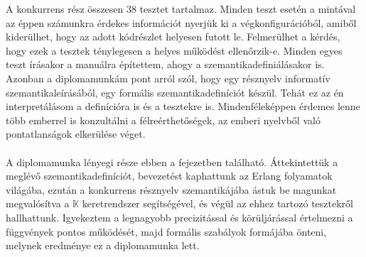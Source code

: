 A konkurrens rész összesen 38 tesztet tartalmaz. Minden teszt esetén a mintával az éppen számunkra érdekes információt nyerjük ki a végkonfigurációból, amiből kiderülhet, hogy az adott kódrészlet helyesen futott le. Felmerülhet a kérdés, hogy ezek a tesztek ténylegesen a helyes működést ellenőrzik-e. Minden egyes teszt írásakor a manuálra építettem, ahogy a szemantikadefiniálásakor is. Azonban a diplomamunkám pont arról szól, hogy egy résznyelv informatív szemantikaleírásából, egy formális szemantikadefiníciót készül. Tehát ez az én interpretálásom a definícióra is és a tesztekre is. Mindenféleképpen érdemes lenne több emberrel is konzultálni a félreérthetőségek, az emberi nyelvből való pontatlanságok elkerülése véget.

\paragraph{}
A diplomamunka lényegi része ebben a fejezetben található. Áttekintettük a meglévő szemantikadefiníciót, bevezetést kaphattunk az Erlang folyamatok világába, ezután a konkurrens résznyelv szemantikájába ástuk be magunkat megvalósítva a $\mathbb{K}$ keretrendszer segítségével, és végül az ehhez tartozó tesztekről hallhattunk. Igyekeztem a legnagyobb precizitással és körüljárással értelmezni a függvények pontos működését, majd formális szabályok formájába önteni, melynek eredménye ez a diplomamunka lett.

